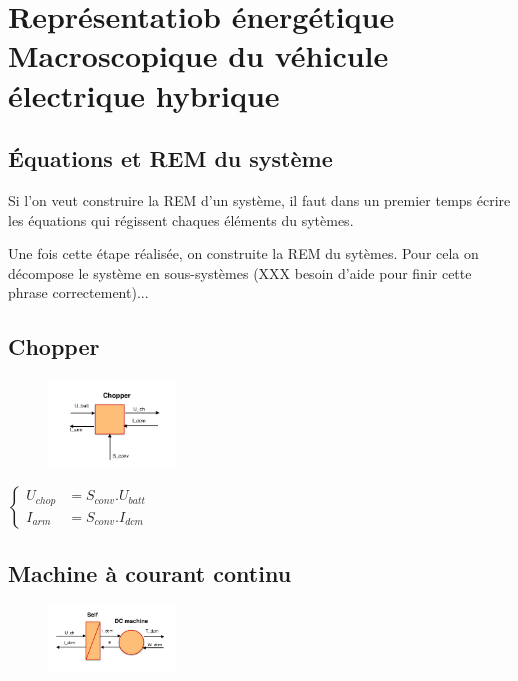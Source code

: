 \section{Représentatiob énergétique Macroscopique du véhicule électrique hybrique}

\subsection{Équations et REM du système}

Si l'on veut construire la REM d'un système, il faut dans un premier temps écrire les équations qui régissent chaques éléments du sytèmes. 

Une fois cette étape réalisée, on construite la REM du sytèmes. Pour cela on décompose le système en sous-systèmes (XXX besoin d'aide pour finir cette phrase correctement)...

\subsection{Chopper}

\begin{figure}
\includegraphics[width=0.3\textwidth]{images/Chopper.png}
\end{figure}

$\begin{cases}
	 U_{chop} &= S_{conv}.U_{batt}\\
	I_{arm} &= S_{conv}.I_{dcm}
\end{cases}$


\subsection{Machine à courant continu}

\begin{figure}
\includegraphics[width=0.3\textwidth]{images/MCC.png}
\end{figure}

